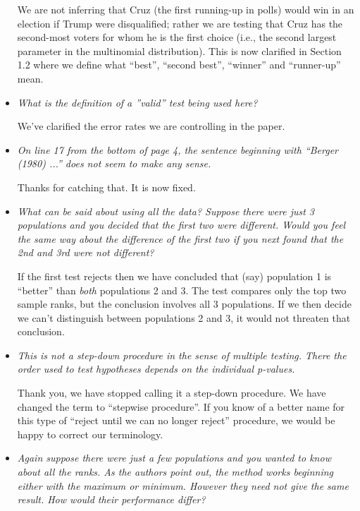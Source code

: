 \documentclass[]{article}
\theoremstyle{remark}
\begin{document}
\begin{itemize}
We are not inferring that Cruz (the first running-up in polls) would win in an election if Trump were disqualified; rather we are testing that Cruz has the second-most voters for whom he is the first choice (i.e., the second largest parameter in the multinomial distribution). This is now clarified in Section 1.2 where we define what ``best'', ``second best'', ``winner'' and ``runner-up'' mean.

\item {\em What is the definition of a ”valid” test being used here?}

We've clarified the error rates we are controlling in the paper.

\item {\em On line 17 from the bottom of page 4, the sentence beginning with ``Berger (1980) ...'' does not seem to make any sense.}

Thanks for catching that. It is now fixed.

\item {\em What can be said about using all the data? Suppose there were just 3 populations and you decided that the first two were different. Would you feel the same way about the difference of the first two if you next found that the 2nd and 3rd were not different?}

If the first test rejects then we have concluded that (say) population 1 is ``better'' than {\em both} populations 2 and 3. The test compares only the top two sample ranks, but the conclusion involves all 3 populations. If we then decide we can't distinguish between populations 2 and 3, it would not threaten that conclusion.



\item {\em This is not a step-down procedure in the sense of multiple testing. There the order used to test hypotheses depends on the individual p-values.}

Thank you, we have stopped calling it a step-down procedure. We have changed the term to ``stepwise procedure''. If you know of a better name for this type of ``reject until we can no longer reject'' procedure, we would be happy to correct our terminology.

\item {\em Again suppose there were just a few populations and you wanted to know about all the ranks. As the authors point out, the method works beginning either with the maximum or minimum. However they need not give the same result. How would their performance differ?}


\end{itemize}
\end{document}
